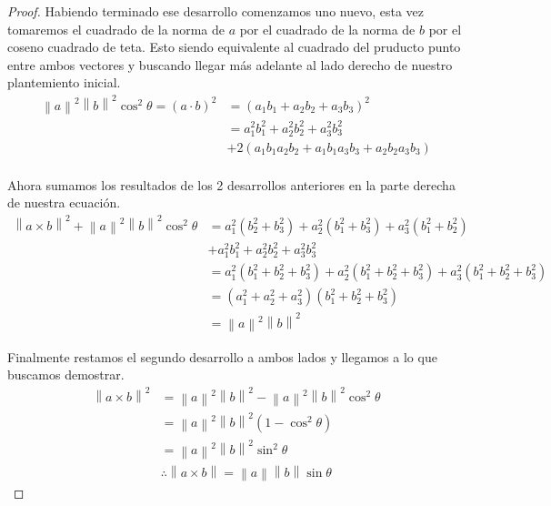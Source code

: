 \documentclass{article}
\newcommand{\norm}[1]{\left\lVert#1\right\rVert}
\begin{document}
\begin{proof}
Habiendo terminado ese desarrollo comenzamos uno nuevo, esta vez tomaremos el cuadrado de la norma de $a$ por el cuadrado de la norma de $b$ por el coseno cuadrado de teta. Esto siendo equivalente al cuadrado del pruducto punto entre ambos vectores y buscando llegar más adelante al lado derecho de nuestro plantemiento inicial.
\begin{equation*}
    \begin{split}
            \norm{a}^2\norm{b}^2\cos^2\theta=(a\cdot b)^2   &= (a_{1}b_{1}+a_{2}b_{2}+a_{3}b_{3})^2\\
                &= a_{1}^2b_{1}^2+a_{2}^2b_{2}^2+a_{3}^2b_{3}^2 \\
                &+ 2(a_{1}b_{1}a_{2}b_{2}+a_{1}b_{1}a_{3}b_{3}+a_{2}b_{2}a_{3}b_{3}) \\
    \end{split}
\end{equation*}

Ahora sumamos los resultados de los 2 desarrollos anteriores en la parte derecha de nuestra ecuación.
\begin{equation*}
    \begin{split}
            \norm{a\times b}^2 + \norm{a}^2\norm{b}^2\cos^2\theta   &= a_{1}^2(b_{2}^2+b_{3}^2)+a_{2}^2(b_{1}^2+b_{3}^2)+ a_{3}^2(b_{1}^2+b_{2}^2) \\
            &+ a_{1}^2b_{1}^2+a_{2}^2b_{2}^2+a_{3}^2b_{3}^2 \\
            &= a_{1}^2(b_{1}^2+b_{2}^2+b_{3}^2)+a_{2}^2(b_{1}^2+b_{2}^2+b_{3}^2)+ a_{3}^2(b_{1}^2+b_{2}^2+b_{3}^2) \\
            &= (a_{1}^2+a_{2}^2+a_{3}^2)(b_{1}^2+b_{2}^2+b_{3}^2) \\
            &= \norm{a}^2\norm{b}^2
    \end{split}
\end{equation*}

Finalmente restamos el segundo desarrollo a ambos lados y llegamos a lo que buscamos demostrar.\\
\begin{equation*}
    \begin{split}
        \norm{a\times b}^2 &= \norm{a}^2\norm{b}^2 - \norm{a}^2\norm{b}^2\cos^2\theta \\
        &= \norm{a}^2\norm{b}^2(1-\cos^2\theta) \\
        &= \norm{a}^2\norm{b}^2\sin^2\theta \\
        & \therefore \norm{a\times b} = \norm{a}\norm{b}\sin\theta 
    \end{split}
\end{equation*}
\end{proof}
\newpage
\end{document}
